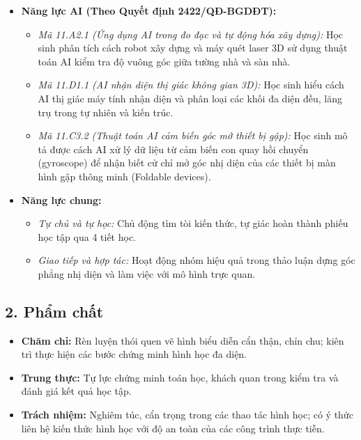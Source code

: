 \documentclass[12pt, a4paper]{article}
\begin{document}
\begin{itemize}[leftmargin=1.2cm]
    \item \textbf{Năng lực AI (Theo Quyết định 2422/QĐ-BGDĐT):}
    \begin{itemize}[leftmargin=0.6cm]
        \item \textit{Mã 11.A2.1 (Ứng dụng AI trong đo đạc và tự động hóa xây dựng):} Học sinh phân tích cách robot xây dựng và máy quét laser 3D sử dụng thuật toán AI kiểm tra độ vuông góc giữa tường nhà và sàn nhà.
        \item \textit{Mã 11.D1.1 (AI nhận diện thị giác không gian 3D):} Học sinh hiểu cách AI thị giác máy tính nhận diện và phân loại các khối đa diện đều, lăng trụ trong tự nhiên và kiến trúc.
        \item \textit{Mã 11.C3.2 (Thuật toán AI cảm biến góc mở thiết bị gập):} Học sinh mô tả được cách AI xử lý dữ liệu từ cảm biến con quay hồi chuyển (gyroscope) để nhận biết cử chỉ mở góc nhị diện của các thiết bị màn hình gập thông minh (Foldable devices).
    \end{itemize}

    \item \textbf{Năng lực chung:}
    \begin{itemize}[leftmargin=0.6cm]
        \item \textit{Tự chủ và tự học:} Chủ động tìm tòi kiến thức, tự giác hoàn thành phiếu học tập qua 4 tiết học.
        \item \textit{Giao tiếp và hợp tác:} Hoạt động nhóm hiệu quả trong thảo luận dựng góc phẳng nhị diện và làm việc với mô hình trực quan.
    \end{itemize}
\end{itemize}

\subsection*{2. Phẩm chất}

\begin{itemize}[leftmargin=1.2cm]
    \item \textbf{Chăm chỉ:} Rèn luyện thói quen vẽ hình biểu diễn cẩn thận, chỉn chu; kiên trì thực hiện các bước chứng minh hình học đa diện.
    \item \textbf{Trung thực:} Tự lực chứng minh toán học, khách quan trong kiểm tra và đánh giá kết quả học tập.
    \item \textbf{Trách nhiệm:} Nghiêm túc, cẩn trọng trong các thao tác hình học; có ý thức liên hệ kiến thức hình học với độ an toàn của các công trình thực tiễn.
\end{itemize}
\end{document}
